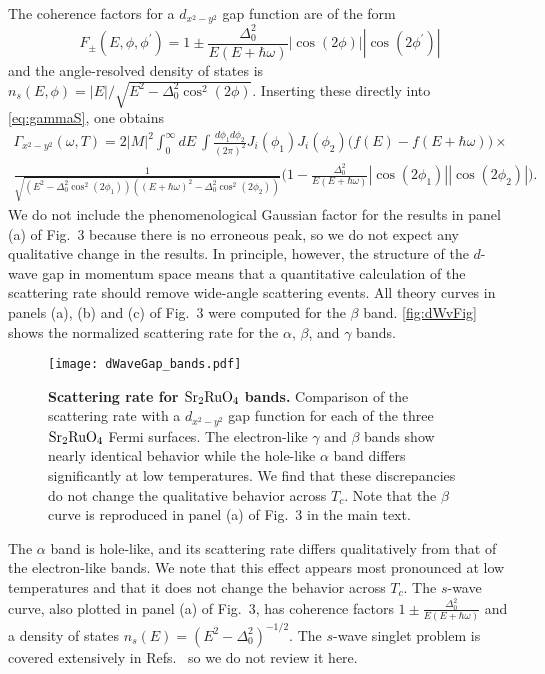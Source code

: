 	The coherence factors for a $d_{x^2-y^2}$ gap function are of the form
	\begin{equation}
	F_\pm(E,\phi,\phi^\prime)=1\pm\frac{\Delta_0^2}{E(E+\hbar\omega)}|\cos(2\phi)||\cos(2\phi^\prime)|
	\end{equation}
	and the angle-resolved density of states is
	$n_s(E,\phi)=|E|/\sqrt{E^2-\Delta_0^2\cos^2(2\phi)}$. Inserting these directly into \autoref{eq:gammaS}, one obtains
	\begin{multline}
	\Gamma_{x^2-y^2}(\omega,T)=2|M|^2\int_0^\infty dE~\int\frac{d\phi_1d\phi_2}{(2\pi)^2}J_i(\phi_1)J_i(\phi_2)\big(f(E)-f(E+\hbar\omega)\big)\times\\\frac{1}{\sqrt{(E^2-\Delta_0^2\cos^2(2\phi_1))((E+\hbar\omega)^2-\Delta_0^2\cos^2(2\phi_2))}}\bigg(1-\frac{\Delta_0^2}{E(E+\hbar\omega)}|\cos(2\phi_1)||\cos(2\phi_2)|\bigg).
	\label{eq:dWaveEq}
	\end{multline}
	We do not include the phenomenological Gaussian factor for the results in panel (a) of Fig.~3 because there is no erroneous peak, so we do not expect any qualitative change in the results. In principle, however, the structure of the $d$-wave gap in momentum space means that a quantitative calculation of the scattering rate should remove wide-angle scattering events. All theory curves in panels (a), (b) and (c) of Fig.~3 were computed for the $\beta$ band. \autoref{fig:dWvFig} shows the normalized scattering rate for the $\alpha$, $\beta$, and $\gamma$ bands.
	\begin{figure}
		\centering
		\texttt{[image: dWaveGap\_bands.pdf]}
		\caption{{\bf Scattering rate for ${\rm Sr}_2{\rm RuO}_4$ bands.} Comparison of the scattering rate with a $d_{x^2-y^2}$ gap function for each of the three ${\rm Sr}_2{\rm RuO}_4$ Fermi surfaces. The electron-like $\gamma$ and $\beta$ bands show nearly identical behavior while the hole-like $\alpha$ band differs significantly at low temperatures. We find that these discrepancies do not change the qualitative behavior across $T_c$. Note that the $\beta$ curve is reproduced in panel (a) of Fig.~3 in the main text.}
		\label{fig:dWvFig}
	\end{figure}
	The $\alpha$ band is hole-like, and its scattering rate differs qualitatively from that of the electron-like bands. We note that this effect appears most pronounced at low temperatures and that it does not change the behavior across $T_c$. The $s$-wave curve, also plotted in panel (a) of Fig.~3, has coherence factors $1\pm\frac{\Delta_0^2}{E(E+\hbar\omega)}$ and a density of states $n_s(E)=(E^2-\Delta_0^2)^{-1/2}$. The $s$-wave singlet problem is covered extensively in Refs.~\cite{BCS1957,Tinkham,Schrieffer} so we do not review it here.
	

